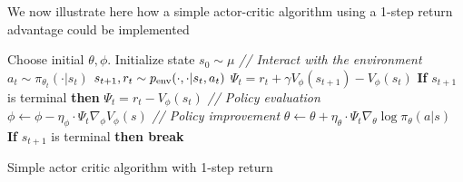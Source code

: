 We now illustrate here how a simple actor-critic algorithm using a 1-step return advantage could be implemented

\begin{algorithm}
\begin{algorithmic}[1]
\STATE Choose initial $\theta, \phi$.
    \STATE Initialize state $s_0 \sim \mu$
        \STATE \textit{// Interact with the environment}
        \STATE $a_t \sim \pi_{\theta_t}(\cdot | s_t)$
        \STATE $s_{t+1}, r_t \sim p_{\text{env}}(\cdot, \cdot | s_t, a_t)$
        \STATE $\Psi_t = r_t + \gamma V_\phi(s_{t+1}) - V_\phi(s_t)$
        \STATE \textbf{If} $s_{t+1}$ is terminal \textbf{then }$\Psi_t = r_t - V_\phi(s_t)$ 
        \STATE \textit{// Policy evaluation}
        \STATE $\phi \leftarrow \phi - \eta_{\phi} \cdot \Psi_t \nabla_{\phi}V_{\phi}(s) $
        \STATE \textit{// Policy improvement}
        \STATE $\theta \leftarrow \theta + \eta_{\theta} \cdot \Psi_t \nabla_{\theta} \log \pi_{\theta}(a|s)$ 
        \STATE \textbf{If} $s_{t+1}$ is terminal \textbf{then break}
    \ENDFOR
\ENDFOR
\end{algorithmic}
\caption{Simple actor critic algorithm with 1-step return}
\label{alg:ac_methods}
\end{algorithm}



